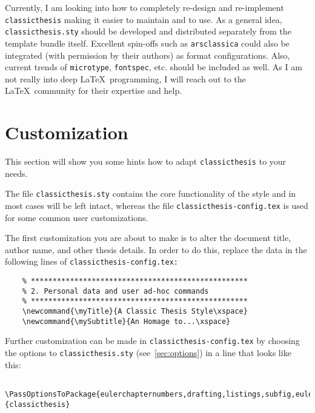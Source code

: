 Currently, I am looking into how to completely re-design and 
re-implement \texttt{classicthesis} making it easier to maintain and 
to use. As a general idea, \texttt{classicthesis.sty} should be 
developed and distributed separately from the template bundle itself. 
Excellent spin-offs such as \texttt{arsclassica} could also be 
integrated (with permission by their authors) as format configurations. 
Also, current trends of \texttt{microtype}, \texttt{fontspec}, etc. 
should be included as well. As I am not really into deep 
\LaTeX\ programming, 
I will reach out to the \LaTeX\ community for their expertise and help.

\section{Customization}\label{sec:custom}
This section will show you some hints how to adapt 
\texttt{classicthesis} to your needs.

The file \texttt{classicthesis.sty}
contains the core functionality of the style and in most cases will
be left intact, whereas the file \texttt{classic\-thesis-config.tex}
is used for some common user customizations. 

The first customization you are about to make is to alter the document
title, author name, and other thesis details. In order to do this, replace
the data in the following lines of \texttt{classicthesis-config.tex:}%

\begin{lstlisting}
    % **************************************************
    % 2. Personal data and user ad-hoc commands
    % **************************************************
    \newcommand{\myTitle}{A Classic Thesis Style\xspace} 
    \newcommand{\mySubtitle}{An Homage to...\xspace} 
\end{lstlisting}

Further customization can be made in \texttt{classicthesis-config.tex}
by choosing the options to \texttt{classicthesis.sty} 
(see~\autoref{sec:options}) in a line that looks like this:

\begin{lstlisting}
    \PassOptionsToPackage{eulerchapternumbers,drafting,listings,subfig,eulermath,parts}{classicthesis}
\end{lstlisting}

